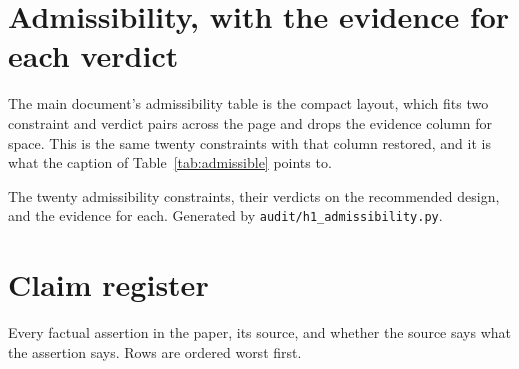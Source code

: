 \tableofcontents
\clearpage



\clearpage


\clearpage


\section{Admissibility, with the evidence for each verdict}
The main document's admissibility table is the compact layout, which fits two
constraint and verdict pairs across the page and drops the evidence column for
space. This is the same twenty constraints with that column restored, and it is
what the caption of Table~\ref{tab:admissible} points to.
\begin{table}[htbp]
\centering
\footnotesize
\caption{\label{tab:admissible_full}The twenty admissibility constraints, their
verdicts on the recommended design, and the evidence for each. Generated by
\texttt{audit/h1\_admissibility.py}.}
\begin{adjustwidth}{-1.0cm}{-1.0cm}

\end{adjustwidth}
\end{table}

\clearpage
\printbibliography[title={References}]

\ifshowregister
\section{Claim register}
Every factual assertion in the paper, its source, and whether the source
says what the assertion says. Rows are ordered worst first.
\begin{adjustwidth}{-1.4cm}{-1.4cm}
\footnotesize

\end{adjustwidth}
\fi


